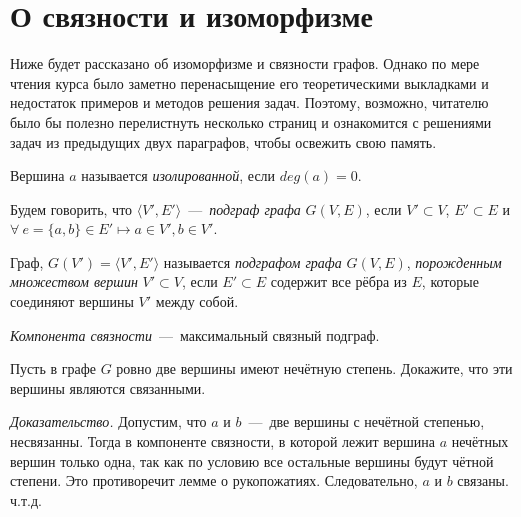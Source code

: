 \section{О связности и изоморфизме}

	Ниже будет рассказано об изоморфизме и связности графов. Однако по мере чтения курса было заметно перенасыщение 
	его теоретическими выкладками и недостаток примеров и методов решения задач. Поэтому, возможно, читателю было бы полезно 
	перелистнуть несколько страниц и ознакомится с решениями задач из предыдущих двух параграфов, чтобы освежить свою память.


\begin{definition}
	Вершина $a$ называется \emph{изолированной}, если $deg(a) = 0$.
\end{definition}

\begin{definition}
	Будем говорить, что $\langle V', E' \rangle$~---~\emph{подграф графа} $G(V, E)$, если 
	$V' \subset V$, $E' \subset E$ и $\forall \!\ e = \lbrace a, b\rbrace \in E' \mapsto a \in V', b \in V'$.
	
	Граф, $G(V') = \langle V', E' \rangle$ называется \emph{подграфом графа} $G(V, E)$, \emph{порожденным множеством вершин} $V' \subset V$, 
	если $E' \subset E$ содержит все рёбра из $E$, которые соединяют вершины $V'$ между собой.
\end{definition}

\begin{definition}
	\emph{Компонента связности}~---~максимальный связный подграф.
\end{definition}
		
\begin{statement}
	Пусть в графе $G$ ровно две вершины имеют нечётную степень. Докажите, что эти вершины являются связанными.
	
	\emph{Доказательство.} Допустим, что $a$ и $b$~---~две вершины с нечётной степенью, несвязанны. Тогда в компоненте связности, 
	в которой лежит вершина $a$ нечётных вершин только одна, так как по условию все остальные вершины будут чётной степени. 
	Это противоречит лемме о рукопожатиях. Следовательно, $a$ и $b$ связаны. ч.т.д.
\end{statement}

